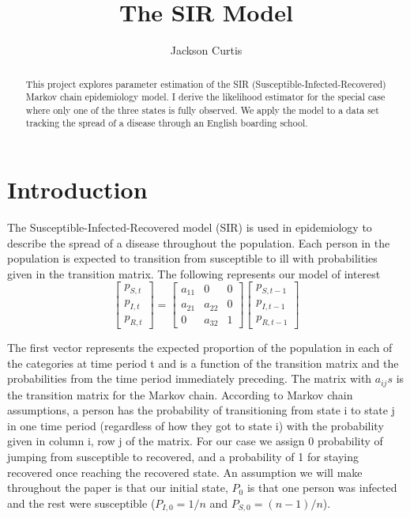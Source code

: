 \documentclass{svproc}
\begin{document}
\mainmatter              
\title{The SIR Model}


\author{Jackson Curtis}


\maketitle           

\begin{abstract}
This project explores parameter estimation of the SIR (Susceptible-Infected-Recovered) Markov chain epidemiology model. I derive the likelihood estimator for the special case where only one of the three states is fully observed. We apply the model to a data set tracking the spread of a disease through an English boarding school. 
\end{abstract}

\section{Introduction}
The Susceptible-Infected-Recovered model (SIR) is used in epidemiology to describe the spread of a disease throughout the population. Each person in the population is expected to transition from susceptible to ill with probabilities given in the transition matrix. The following represents our model of interest
\begin{equation}
\begin{bmatrix}
    p_{S,t}       \\
    p_{I,t}      \\

    p_{R,t}     
\end{bmatrix}
=
\begin{bmatrix}
a_{11} & 0 & 0 \\
a_{21} & a_{22} & 0 \\
0 & a_{32} & 1
\end{bmatrix}
\begin{bmatrix}
    p_{S,t-1}       \\
    p_{I,t-1}      \\

    p_{R,t-1}     
\end{bmatrix}
\label{e1}
\end{equation}

The first vector represents the expected proportion of the population in each of the categories at time period t and is a function of the transition matrix and the probabilities from the time period immediately preceding. The matrix with $a_{ij}s$ is the transition matrix for the Markov chain. According to Markov chain assumptions, a person has the probability of transitioning from state i to state j in one time period (regardless of how they got to state i) with the probability given in column i, row j of the matrix. For our case we assign 0 probability of jumping from susceptible to recovered, and a probability of 1 for staying recovered once reaching the recovered state. An assumption we will make throughout the paper is that our initial state, $P_0$ is that one person was infected and the rest were susceptible ($P_{I,0}=1/n$ and $P_{S, 0} = (n-1)/n$).
\end{document}
